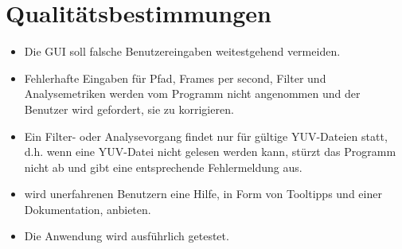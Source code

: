 \chapter{Qualitätsbestimmungen}

\begin{itemize}
\item Die GUI soll falsche Benutzereingaben weitestgehend vermeiden.
\item Fehlerhafte Eingaben für Pfad, Frames per second, Filter und Analysemetriken werden vom Programm nicht angenommen und der Benutzer wird gefordert, sie zu korrigieren.
\item Ein Filter- oder Analysevorgang findet nur für gültige YUV-Dateien statt, d.h. wenn eine YUV-Datei nicht gelesen werden kann, stürzt das Programm nicht ab und gibt eine entsprechende Fehlermeldung aus.
\item \projektTitel wird unerfahrenen Benutzern eine Hilfe, in Form von Tooltipps und einer Dokumentation, anbieten.
\item Die Anwendung wird ausführlich getestet.
\end{itemize}